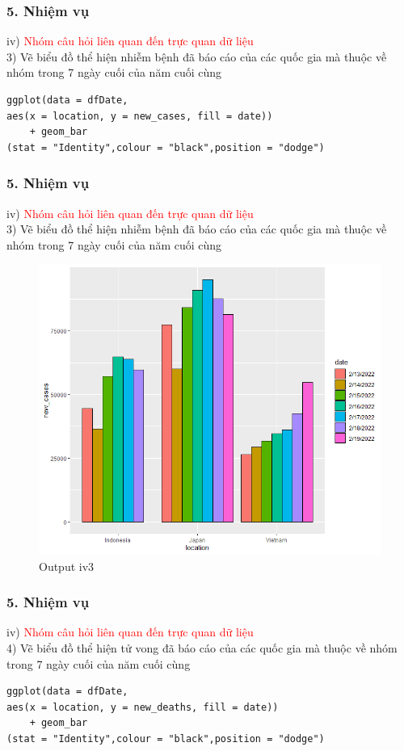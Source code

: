 \documentclass[english,10pt,table]{beamer}
\begin{document}
\begin{frame}[fragile]
\frametitle{5.  Nhiệm vụ}
iv) \textcolor{red}{Nhóm câu hỏi liên quan đến trực quan dữ liệu}\\
    3) Vẽ biểu đồ thể hiện nhiễm bệnh đã báo cáo của các quốc gia  mà thuộc về nhóm trong 7 ngày cuối của năm cuối cùng
\begin{lstlisting}[frame=single]  
ggplot(data = dfDate, 
aes(x = location, y = new_cases, fill = date)) 
    + geom_bar
(stat = "Identity",colour = "black",position = "dodge")
\end{lstlisting}
\end{frame}

\begin{frame}[fragile]
\frametitle{5.  Nhiệm vụ}
iv) \textcolor{red}{Nhóm câu hỏi liên quan đến trực quan dữ liệu}\\
    3) Vẽ biểu đồ thể hiện nhiễm bệnh đã báo cáo của các quốc gia  mà thuộc về nhóm trong 7 ngày cuối của năm cuối cùng
	\begin{figure}[h!]
	\begin{center}
		    \includegraphics[scale = 0.4]{Images/IV/iv (3).png}
		     \caption{Output iv3}
		\end{center}
		\end{figure}
\end{frame}

\begin{frame}[fragile]
\frametitle{5.  Nhiệm vụ}
iv) \textcolor{red}{Nhóm câu hỏi liên quan đến trực quan dữ liệu}\\
    4) Vẽ biểu đồ thể hiện tử vong đã báo cáo của các quốc gia  mà thuộc về nhóm trong 7 ngày cuối của năm cuối cùng
\begin{lstlisting}[frame=single]  
ggplot(data = dfDate, 
aes(x = location, y = new_deaths, fill = date)) 
    + geom_bar
(stat = "Identity",colour = "black",position = "dodge")
\end{lstlisting}
\end{frame}
\end{document}
